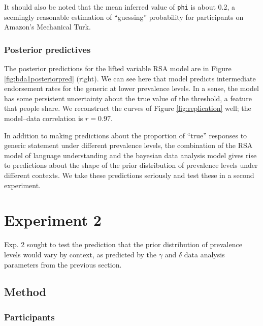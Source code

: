 \documentclass[10pt,letterpaper]{article}
\begin{document}
It should also be noted that the mean inferred value of  \lstinline{phi} is about 0.2, a seemingly reasonable estimation of ``guessing'' probability for participants on Amazon's Mechanical Turk.

\subsubsection{Posterior predictives}
The posterior predictions for the lifted variable RSA model are in Figure \ref{fig:bda1posteriorpred} (right). We can see here that model predicts intermediate endorsement rates for the generic at lower prevalence levels. In a sense, the model has some persistent uncertainty about the true value of the threshold, a feature that people share. We reconstruct the curves of Figure \ref{fig:replication} well; the model--data correlation is $r = 0.97$.




In addition to making predictions about the proportion of ``true'' responses to generic statement under different prevalence levels, the combination of the RSA model of language understanding and the bayesian data analysis model gives rise to predictions about the shape of the prior distribution of prevalence levels under different contexts. We take these predictions seriously and test these in a second experiment. 

\section{Experiment 2}

Exp. 2 sought to test the prediction that the prior distribution of prevalence levels would vary by context, as predicted by the $\gamma$ and $\delta$ data analysis parameters from the previous section.

\subsection{Method}

\subsubsection{Participants}
\end{document}
